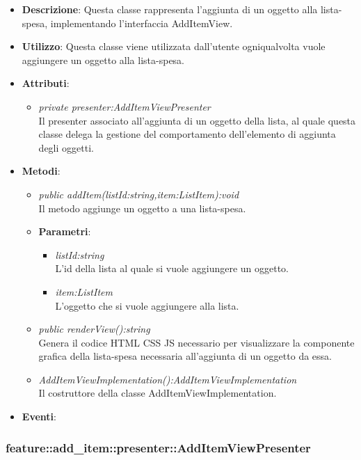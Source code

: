 \begin{itemize}
\item \textbf{Descrizione}: Questa classe rappresenta l'aggiunta di un oggetto alla lista-spesa, implementando l'interfaccia AddItemView.
\item \textbf{Utilizzo}: Questa classe viene utilizzata dall'utente ogniqualvolta vuole aggiungere un oggetto alla lista-spesa.
\item \textbf{Attributi}: 
	\begin{itemize}
	\item \textit{private presenter:AddItemViewPresenter}\\
	Il presenter associato all'aggiunta di un oggetto della lista, al quale questa classe delega la gestione del comportamento dell'elemento di aggiunta degli oggetti.
	\end{itemize}
\item \textbf{Metodi}:
	\begin{itemize}
	\item \textit{public addItem(listId:string,item:ListItem):void}\\
	Il metodo aggiunge un oggetto a una lista-spesa.
			\item{\textbf{Parametri}: \begin{itemize}
			\item \textit{listId:string}\\
			L'id della lista al quale si vuole aggiungere un oggetto.
			\item \textit{item:ListItem}\\
			L'oggetto che si vuole aggiungere alla lista.
			\end{itemize}}
	\item \textit{public renderView():string}\\
	Genera il codice HTML CSS JS necessario per visualizzare la componente grafica della lista-spesa necessaria all'aggiunta di un oggetto da essa.
	\item \textit{AddItemViewImplementation():AddItemViewImplementation}\\
	Il costruttore della classe AddItemViewImplementation.
	\end{itemize}
\item \textbf{Eventi}:
\end{itemize}

\subsubsection{feature::add\_item::presenter::AddItemViewPresenter}

